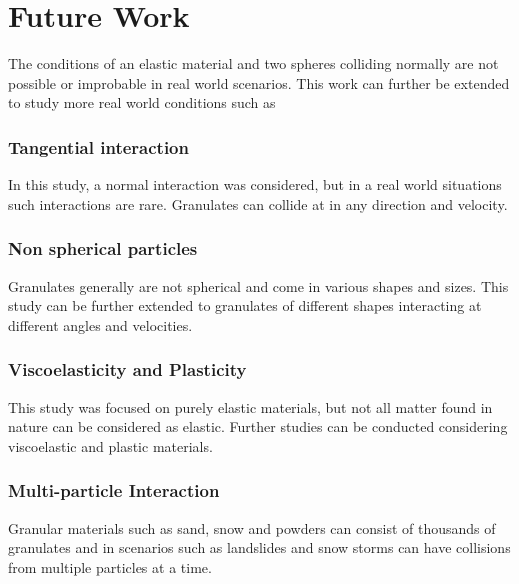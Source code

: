 \section{Future Work}

The conditions of an elastic material and two spheres colliding normally are not possible or improbable in real world scenarios. This work can further be extended to study more real world conditions such as

\subsubsection*{Tangential interaction}

In this study, a normal interaction was considered, but in a real world situations such interactions are rare. Granulates can collide at in any direction and velocity.

\subsubsection*{Non spherical particles}

Granulates generally are not spherical and come in various shapes and sizes. This study can be further extended to granulates of different shapes interacting at different angles and velocities.

\subsubsection*{Viscoelasticity and Plasticity}

This study was focused on purely elastic materials, but not all matter found in nature can be considered as elastic. Further studies can be conducted considering viscoelastic and plastic materials.

\subsubsection*{Multi-particle Interaction}

Granular materials such as sand, snow and powders can consist of thousands of granulates and in scenarios such as landslides and snow storms can have collisions from multiple particles at a time.
